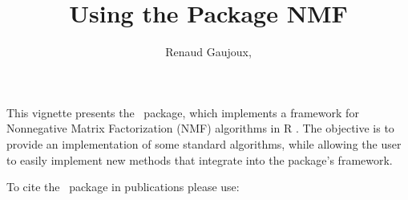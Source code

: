 \documentclass[a4paper]{article}
\newcommand{\nmfpack}{\code{NMF}\ }
\begin{document}



\renewenvironment{Schunk}{\definecolor{shadecolor}{gray}{0.95}%
\begin{shaded}\vspace{\topsep}}{\vspace{\topsep}\end{shaded}}

\newenvironment{tech}{\definecolor{shadecolor}{rgb}{0.92,0.92,1}%
\begin{shaded}\hrule\vspace{0.5em}\small\noindent\textbf{Technical note}\\}%
{\vspace{\topsep}\hrule\end{shaded}}


\title{Using the Package NMF}
\author{Renaud Gaujoux, }

\maketitle


This vignette presents the \nmfpack package, which implements a framework for 
Nonnegative Matrix Factorization (NMF) algorithms in R \cite{R}. The objective is 
to provide an implementation of some standard algorithms, while allowing the user 
to easily implement new methods that integrate into the package's framework.

\bigskip
To cite the \nmfpack package in publications please use:
\end{document}
